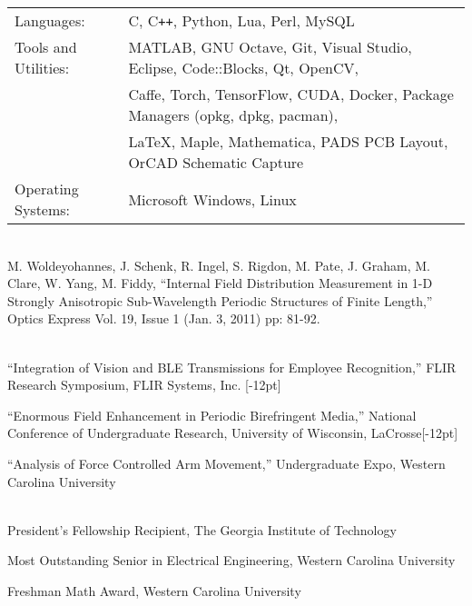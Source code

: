 \documentclass[14pt,letterpaper]{extarticle}
\begin{document}

\medskip\noindent
\begin{tabularx}{\linewidth}{@{}lL@{}}
\footnotesize{Languages:} & \footnotesize{C, C\texttt{++}, Python, Lua, Perl, MySQL}\vspace{0.5mm}\\
\footnotesize{Tools and Utilities:} & \footnotesize{MATLAB, GNU Octave, Git, Visual Studio, Eclipse, Code::Blocks, Qt, OpenCV,}\\
                                    & \footnotesize{Caffe, Torch, TensorFlow, CUDA, Docker, Package Managers (opkg, dpkg, pacman),}\\
                                    & \footnotesize{\LaTeX, Maple, Mathematica, PADS PCB Layout, OrCAD Schematic Capture}\vspace{0.5mm}\\
\footnotesize{Operating Systems:}   & \footnotesize{Microsoft Windows, Linux}\\
\end{tabularx}

\vspace{5.3pt}\\
\noindent
\footnotesize{M. Woldeyohannes, J. Schenk, R. Ingel, S. Rigdon, M. Pate, J. Graham, M. Clare, W. Yang, M. Fiddy, ``Internal Field Distribution Measurement in 1-D Strongly Anisotropic Sub-Wavelength Periodic Structures of Finite Length,'' Optics Express Vol. 19, Issue 1 (Jan. 3, 2011) pp: 81-92.}

\vspace{5.3pt}\\
\footnotesize{``Integration of Vision and BLE Transmissions for Employee Recognition,'' FLIR Research Symposium, FLIR Systems, Inc.}
[-12pt]

\medskip\noindent
\footnotesize{``Enormous  Field  Enhancement  in  Periodic  Birefringent Media,''
National Conference of Undergraduate Research, University of Wisconsin, LaCrosse}[-12pt]

\medskip\noindent
\footnotesize{``Analysis of Force Controlled Arm Movement,'' Undergraduate Expo, Western Carolina University}

\vspace{5.3pt}\\
\noindent\footnotesize{President's Fellowship Recipient, The Georgia Institute of Technology}

\medskip
\noindent\footnotesize{Most Outstanding Senior in Electrical Engineering, Western Carolina University}

\medskip
\noindent\footnotesize{Freshman Math Award, Western Carolina University}
\end{document}
